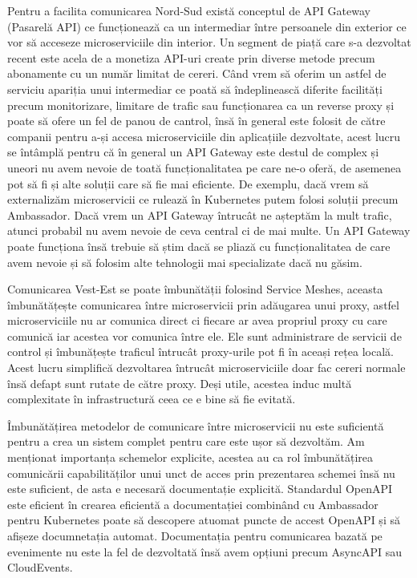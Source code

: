 Pentru a facilita comunicarea Nord-Sud există conceptul de API Gateway (Pasarelă API) ce 
funcționează ca un intermediar între persoanele din exterior ce vor să acceseze microserviciile 
din interior. Un segment de piață care s-a dezvoltat recent este acela de a monetiza
API-uri create prin diverse metode precum abonamente cu un număr limitat de cereri. Când 
vrem să oferim un astfel de serviciu apariția unui intermediar ce poată să îndeplinească
diferite facilități precum monitorizare, limitare de trafic sau funcționarea ca un reverse 
proxy și poate să ofere un fel de panou de cantrol, însă în general este folosit de către
companii pentru a-și accesa microserviciile din aplicațiile dezvoltate, acest lucru se 
întâmplă pentru că în general un API Gateway este destul de complex și uneori nu avem
nevoie de toată funcționalitatea pe care ne-o oferă, de asemenea pot să fi și alte
soluții care să fie mai eficiente. De exemplu, dacă vrem să externalizăm microservicii ce
rulează în Kubernetes putem folosi soluții precum Ambassador. Dacă vrem un API Gateway
întrucât ne așteptăm la mult trafic, atunci probabil nu avem nevoie de ceva central ci de mai multe.
Un API Gateway poate funcționa însă trebuie să știm dacă se pliază cu funcționalitatea de care
avem nevoie și să folosim alte tehnologii mai specializate dacă nu găsim.

Comunicarea Vest-Est se poate îmbunătății folosind Service Meshes, aceasta îmbunătățește 
comunicarea între microservicii prin adăugarea unui proxy, astfel microserviciile nu ar comunica
direct ci fiecare ar avea propriul proxy cu care comunică iar acestea vor comunica între ele.
Ele sunt administrare de servicii de control și îmbunățește traficul întrucât proxy-urile 
pot fi în aceași rețea locală. Acest lucru simplifică dezvoltarea întrucât microserviciile
doar fac cereri normale însă defapt sunt rutate de către proxy. Deși utile, acestea induc multă
complexitate în infrastructură ceea ce e bine să fie evitată.

Îmbunătățirea metodelor de comunicare între microservicii nu este suficientă pentru a
crea un sistem complet pentru care este ușor să dezvoltăm. Am menționat importanța schemelor
explicite, acestea au ca rol îmbunătățirea comunicării capabilităților unui unct de acces prin
prezentarea schemei însă nu este suficient, de asta e necesară documentație explicită.
Standardul OpenAPI este eficient în crearea eficientă a documentației combinând cu Ambassador
pentru Kubernetes poate să descopere atuomat puncte de accest OpenAPI și să afișeze 
documnetația automat. Documentația pentru comunicarea bazată pe evenimente nu este la fel de 
dezvoltată însă avem opțiuni precum AsyncAPI sau CloudEvents.

